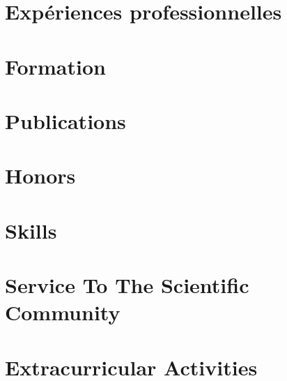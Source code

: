\documentclass{prometheus_cv}
\begin{document}
\thispagestyle{empty}					%
\pagestyle{fancy}			 		%

\vspace*{-1cm}
\centering 


\vspace*{0.4cm}
\section{Expériences professionnelles}


\vspace*{0.4cm}
\section{Formation}


\section{Publications}
%

\section{Honors}
%

\section{Skills}
%


\section{Service To The Scientific Community}
%


\section{Extracurricular Activities}
%
\end{document}

